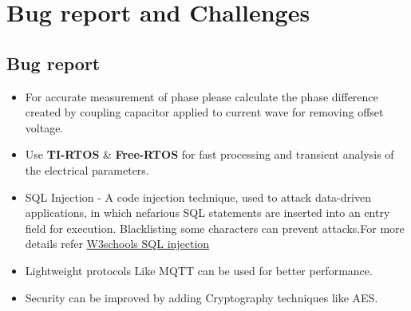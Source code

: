 \documentclass[a4paper,12pt,oneside]{book}
\begin{document}
\section{Bug report and Challenges}
\subsection*{Bug report}
\begin{itemize}
	\item For accurate measurement of phase please calculate the phase difference created by coupling capacitor applied to current wave for removing offset voltage.
	\item Use \textbf{TI-RTOS} \& \textbf{Free-RTOS} for fast processing and transient analysis of the electrical parameters.
	\item{SQL Injection - A code injection technique, used to attack data-driven applications, in which nefarious SQL statements are inserted into an entry field for execution. Blacklisting some characters can prevent attacks.For more details refer \href{www.w3schools.com/sql/sql_injection.asp}{W3schools SQL injection} }
	\item{Lightweight protocols Like MQTT can be used for better performance.}
	\item{Security can be improved by adding Cryptography techniques like AES.}
\end{itemize}
\end{document}
